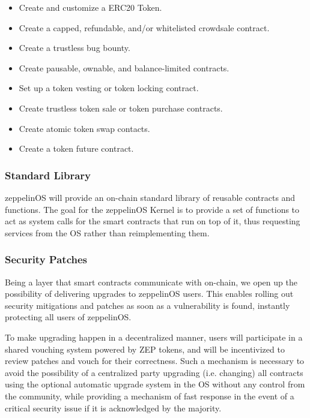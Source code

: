 \documentclass[]{article}
\makeatletter
\DeclareRobustCommand{\_}{%
  \leavevmode\vbox{%
    \hrule\@width.5em
          \@height-.26ex
          \@depth\dimexpr.26ex+.28pt\relax}}
\makeatother
\begin{document}
\begin{itemize}
\item
  {Create and customize a ERC20 Token.}
\item
  {Create a capped, refundable, and/or whitelisted crowdsale contract.}
\item
  {Create a trustless bug bounty.}
\item
  {Create pausable, ownable, and balance-limited contracts.}
\item
  {Set up a token vesting or token locking contract.}
\item Create trustless token sale or token purchase contracts.
\item Create atomic token swap contacts.
\item Create a token future contract.
\end{itemize}

\subsubsection{Standard Library}

zeppelinOS will provide an on-chain standard library of reusable
contracts and functions. The goal for the zeppelinOS Kernel is to
provide a set of functions to act as system calls for the smart
contracts that run on top of it, thus requesting services from the OS
rather than reimplementing them.

\subsubsection{Security Patches}

Being a layer that smart contracts communicate with on-chain, we open
up the possibility of delivering upgrades to zeppelinOS users. This
enables rolling out security mitigations and patches as soon as a
vulnerability is found, instantly protecting all users of zeppelinOS.

To make upgrading happen in a decentralized manner, users will
participate in a shared vouching system powered by ZEP tokens, and
will be incentivized to review patches and vouch for their
correctness. Such a mechanism is necessary to avoid the possibility of
a centralized party upgrading (i.e. changing) all contracts using the
optional automatic upgrade system in the OS without any control from
the community, while providing a mechanism of fast response in the event
of a critical security issue if it is acknowledged by the majority.
\end{document}
